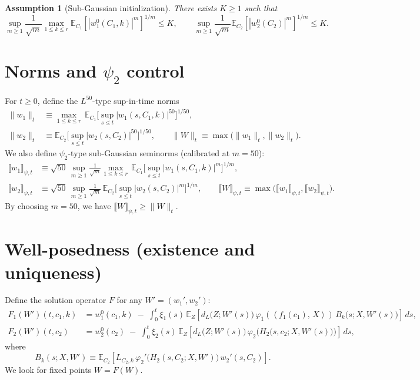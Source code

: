 \documentclass[11pt]{article}
\newcommand{\E}{\mathbb{E}}
\newcommand{\1}{\mathbbm{1}}
\newcommand{\ip}[2]{\left\langle #1,\,#2 \right\rangle}
\newtheorem{assumption}{Assumption}
\begin{document}
\begin{assumption}[Sub-Gaussian initialization]\label{assump:init}
There exists $K\ge 1$ such that
\[
\sup_{m\ge 1}\frac{1}{\sqrt{m}}\max_{1\le k\le r}\E_{C_1}\!\left[|w_1^0(C_1,k)|^m\right]^{1/m}\le K,\qquad
\sup_{m\ge 1}\frac{1}{\sqrt{m}}\E_{C_2}\!\left[|w_2^0(C_2)|^m\right]^{1/m}\le K.
\]
\end{assumption}

\section{Norms and $\psi_2$ control}

For $t\ge 0$, define the $L^{50}$-type sup-in-time norms
\begin{align*}
\|w_1\|_t &\equiv \max_{1\le k\le r}\,\E_{C_1}\Big[\sup_{s\le t}|w_1(s,C_1,k)|^{50}\Big]^{1/50},\\
\|w_2\|_t &\equiv \E_{C_2}\Big[\sup_{s\le t}|w_2(s,C_2)|^{50}\Big]^{1/50},\qquad \|W\|_t \equiv \max\big(\|w_1\|_t,\|w_2\|_t\big).
\end{align*}
We also define $\psi_2$-type sub-Gaussian seminorms (calibrated at $m=50$):
\begin{align*}
\llbracket w_1\rrbracket_{\psi,t} &\equiv \sqrt{50}\,\sup_{m\ge 1}\frac{1}{\sqrt{m}}\max_{1\le k\le r}\,\E_{C_1}\Big[\sup_{s\le t}|w_1(s,C_1,k)|^{m}\Big]^{1/m},\\
\llbracket w_2\rrbracket_{\psi,t} &\equiv \sqrt{50}\,\sup_{m\ge 1}\frac{1}{\sqrt{m}}\,\E_{C_2}\Big[\sup_{s\le t}|w_2(s,C_2)|^{m}\Big]^{1/m},\qquad
\llbracket W\rrbracket_{\psi,t} \equiv \max\big(\llbracket w_1\rrbracket_{\psi,t},\llbracket w_2\rrbracket_{\psi,t}\big).
\end{align*}
By choosing $m=50$, we have $\llbracket W\rrbracket_{\psi,t}\ge \|W\|_t$.

\section{Well-posedness (existence and uniqueness)}

Define the solution operator $F$ for any $W'=(w_1',w_2')$:
\begin{align*}
F_1(W')(t,c_1,k) &= w_1^0(c_1,k)\;-\;\int_0^t \xi_1(s)\,\E_{Z}\!\left[d_L\big(Z;W'(s)\big)\,\varphi_1\!\left(\ip{f_1(c_1)}{X}\right)\,B_k\big(s;X,W'(s)\big)\right]\,ds,\\
F_2(W')(t,c_2) &= w_2^0(c_2)\;-\;\int_0^t \xi_2(s)\,\E_{Z}\!\left[d_L\big(Z;W'(s)\big)\,\varphi_2\!\Big(H_2\big(s,c_2;X,W'(s)\big)\Big)\right]\,ds,
\end{align*}
where
\[
B_k(s;X,W') \equiv \E_{C_2}\!\left[L_{C_2,k}\,\varphi_2'\!\Big(H_2(s,C_2;X,W')\Big)\,w_2'(s,C_2)\right].
\]
We look for fixed points $W=F(W)$.
\end{document}
